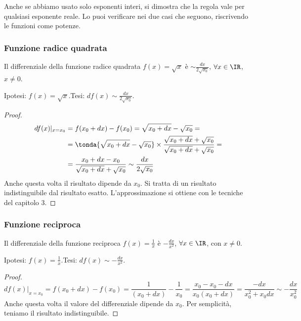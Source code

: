 \begin{osservazione}
Anche se abbiamo usato solo esponenti interi, si dimostra che 
la regola vale per qualsiasi esponente reale. Lo puoi verificare nei due casi 
che seguono, riscrivendo le funzioni come potenze.
\end{osservazione}


\subsubsection{Funzione radice quadrata}
\label{subsubsec:diff01_diffradq}

\begin{teorema}
 Il differenziale della funzione radice quadrata $f(x)=\sqrt{x}$ è
 $\sim\frac{dx}{2\sqrt{x_0}}$, $\forall x\in \IR$, $x\neq 0$.
\end{teorema}

\noindent Ipotesi: \(f(x)=\sqrt{x}\).\tab Tesi: \(df(x)\sim\frac{dx}{2\sqrt{x_0}}\).

\begin{proof}
\begin{align*}
 df(x)|_{x=x_0} &= f(x_0+dx)-f(x_0)=\sqrt{x_0+dx}-\sqrt{x_0}=\\
 &=\tonda{\sqrt{x_0+dx}-\sqrt{x_0}}\times\frac{\sqrt{x_0+dx}+
 \sqrt{x_0}}{\sqrt{x_0+dx}+\sqrt{x_0}}=\\
 &=\frac{x_0+dx-x_0}{\sqrt{x_0+dx}+\sqrt{x_0}}\sim\frac{dx}{2\sqrt{x_0}}
\end{align*}
Anche questa volta il risultato dipende da $x_0$. Si tratta di 
un risultato indistinguibile dal risultato esatto. L'approssimazione si ottiene
con le tecniche del capitolo 3.
\end{proof}

\subsubsection{Funzione reciproca}
\label{subsubsec:diff01_diffrecip}
\begin{teorema}
 Il differenziale della funzione reciproca $f(x)=\frac{1}{x}$ è $-\frac{dx}{x^2}$, 
 $\forall x\in \IR$, con $x\neq 0$.
\end{teorema}

\noindent Ipotesi: $f(x)=\frac{1}{x}$.\tab Tesi: $df(x)\sim-\frac{dx}{x^2}$.

\begin{proof}
\[
 df(x)|_{x=x_0}= f(x_0+dx)-f(x_0)=\frac{1}{(x_0+dx)}-\frac{1}{x_0}=
 \frac{x_0-x_0-dx}{x_0(x_0+dx)}=\frac{-dx}{x_0^2+x_0dx}\sim-\frac{dx}{x_0^2}
\]
Anche questa volta il valore del differenziale dipende da $x_0$. 
Per semplicità, teniamo il risultato indistinguibile.
\end{proof}

